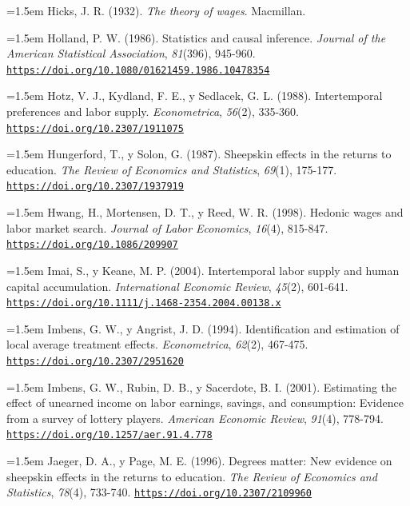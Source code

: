 \documentclass[10pt,a4paper]{article}
\begin{document}
\noindent\hangindent=1.5em Hicks, J. R. (1932). \textit{The theory of wages}. Macmillan.

\noindent\hangindent=1.5em Holland, P. W. (1986). Statistics and causal inference. \textit{Journal of the American Statistical Association}, \textit{81}(396), 945-960. \href{https://doi.org/10.1080/01621459.1986.10478354}{\nolinkurl{https://doi.org/10.1080/01621459.1986.10478354}}

\noindent\hangindent=1.5em Hotz, V. J., Kydland, F. E., y Sedlacek, G. L. (1988). Intertemporal preferences and labor supply. \textit{Econometrica}, \textit{56}(2), 335-360. \href{https://doi.org/10.2307/1911075}{\nolinkurl{https://doi.org/10.2307/1911075}}

\noindent\hangindent=1.5em Hungerford, T., y Solon, G. (1987). Sheepskin effects in the returns to education. \textit{The Review of Economics and Statistics}, \textit{69}(1), 175-177. \href{https://doi.org/10.2307/1937919}{\nolinkurl{https://doi.org/10.2307/1937919}}

\noindent\hangindent=1.5em Hwang, H., Mortensen, D. T., y Reed, W. R. (1998). Hedonic wages and labor market search. \textit{Journal of Labor Economics}, \textit{16}(4), 815-847. \href{https://doi.org/10.1086/209907}{\nolinkurl{https://doi.org/10.1086/209907}}

\noindent\hangindent=1.5em Imai, S., y Keane, M. P. (2004). Intertemporal labor supply and human capital accumulation. \textit{International Economic Review}, \textit{45}(2), 601-641. \href{https://doi.org/10.1111/j.1468-2354.2004.00138.x}{\nolinkurl{https://doi.org/10.1111/j.1468-2354.2004.00138.x}}

\noindent\hangindent=1.5em Imbens, G. W., y Angrist, J. D. (1994). Identification and estimation of local average treatment effects. \textit{Econometrica}, \textit{62}(2), 467-475. \href{https://doi.org/10.2307/2951620}{\nolinkurl{https://doi.org/10.2307/2951620}}

\noindent\hangindent=1.5em Imbens, G. W., Rubin, D. B., y Sacerdote, B. I. (2001). Estimating the effect of unearned income on labor earnings, savings, and consumption: Evidence from a survey of lottery players. \textit{American Economic Review}, \textit{91}(4), 778-794. \href{https://doi.org/10.1257/aer.91.4.778}{\nolinkurl{https://doi.org/10.1257/aer.91.4.778}}

\noindent\hangindent=1.5em Jaeger, D. A., y Page, M. E. (1996). Degrees matter: New evidence on sheepskin effects in the returns to education. \textit{The Review of Economics and Statistics}, \textit{78}(4), 733-740. \href{https://doi.org/10.2307/2109960}{\nolinkurl{https://doi.org/10.2307/2109960}}
\end{document}
